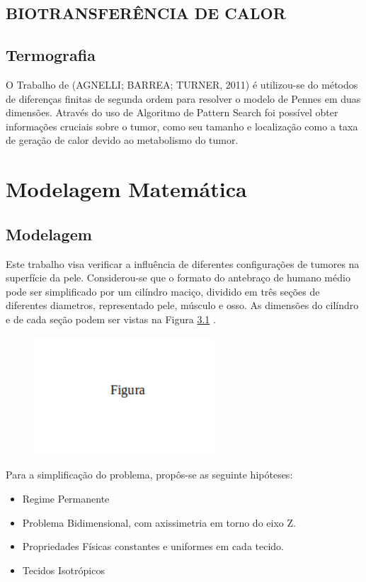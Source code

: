\documentclass[
	12pt,				%
	openright,			%
	oneside,			%
	a4paper,			%
	english,			%
	french,				%
	spanish,			%
	brazil				%
	]{abntex2}
\begin{document}
\section{BIOTRANSFERÊNCIA DE CALOR}
\section{Termografia}
O Trabalho de (AGNELLI; BARREA; TURNER, 2011) é utilizou-se do métodos de
diferenças finitas de segunda ordem para resolver o modelo de Pennes em duas dimensões.
Através do uso de Algoritmo de Pattern Search foi possível obter informações cruciais sobre o
tumor, como seu tamanho e localização como a taxa de geração de calor devido ao metabolismo
do tumor.


\chapter{Modelagem Matemática}

\section{Modelagem}
Este trabalho  visa verificar a influência de diferentes configurações de tumores na superfície da pele. Considerou-se que o formato do antebraço de humano médio pode ser simplificado por um cilíndro maciço, dividido em três seções de diferentes diametros, representado pele, músculo e osso. As dimensões do cilíndro e de cada seção podem ser vistas na Figura \ref{fig:geometria} .

\begin{figure}[h!]
	\centering
	\includegraphics[width=0.6\textwidth]{Fig.png}
	\caption{ \label{fig:geometria}}
\end{figure}

Para a simplificação do problema, propôs-se as seguinte hipóteses:
\begin{itemize}
\item Regime Permanente
\item Problema Bidimensional, com axissimetria em torno do eixo Z.
\item Propriedades Físicas constantes e uniformes em cada tecido.
\item Tecidos Isotrópicos
\end{itemize}
\end{document}
